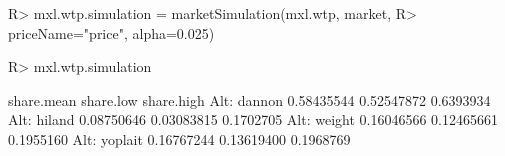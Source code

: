 \documentclass[article]{jss}
\begin{document}
\begin{CodeChunk}

\begin{CodeInput}
R> mxl.wtp.simulation = marketSimulation(mxl.wtp, market,
R>                                       priceName="price", alpha=0.025)
\end{CodeInput}
\end{CodeChunk}

\begin{CodeChunk}

\begin{CodeInput}
R> mxl.wtp.simulation
\end{CodeInput}

\begin{CodeOutput}
             share.mean  share.low share.high
Alt: dannon  0.58435544 0.52547872  0.6393934
Alt: hiland  0.08750646 0.03083815  0.1702705
Alt: weight  0.16046566 0.12465661  0.1955160
Alt: yoplait 0.16767244 0.13619400  0.1968769
\end{CodeOutput}
\end{CodeChunk}


\end{document}
